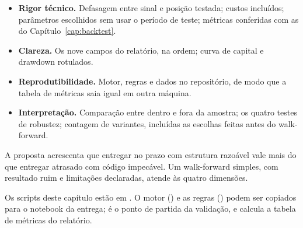 \begin{itemize}
  \item \textbf{Rigor técnico.} Defasagem entre sinal e posição testada; custos incluídos; parâmetros escolhidos sem usar o período de teste; métricas conferidas com as do Capítulo~\ref{cap:backtest}.
  \item \textbf{Clareza.} Os nove campos do relatório, na ordem; curva de capital e drawdown rotulados.
  \item \textbf{Reprodutibilidade.} Motor, regras e dados no repositório, de modo que a tabela de métricas saia igual em outra máquina.
  \item \textbf{Interpretação.} Comparação entre dentro e fora da amostra; os quatro testes de robustez; contagem de variantes, incluídas as escolhas feitas antes do walk-forward.
\end{itemize}

A proposta acrescenta que entregar no prazo com estrutura razoável vale mais do que entregar atrasado com código impecável. Um walk-forward simples, com resultado ruim e limitações declaradas, atende às quatro dimensões.

\begin{repositorio}
Os scripts deste capítulo estão em . O motor () e as regras () podem ser copiados para o notebook da entrega;  é o ponto de partida da validação, e  calcula a tabela de métricas do relatório.
\end{repositorio}

